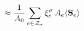 \documentclass[preview]{standalone}
\begin{document}
\begin{align*}
\special{dvisvgm:raw <g id='unique000'>}\approx\frac{1}{A_0}\sum_{e\in\mathcal Z_\sigma}\xi_e^\sigma\,A_e\langle\mathbf S_e\rangle\special{dvisvgm:raw </g>}
\end{align*}
\end{document}
